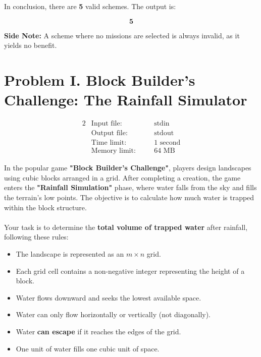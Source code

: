 \documentclass[12pt,a4paper]{article}
\begin{document}
\noindent
In conclusion, there are \textbf{5} valid schemes. The output is:

\[
\mathbf{5}
\]

\noindent
\textbf{Side Note:} A scheme where no missions are selected is always invalid, as it yields no benefit.

\newpage

\section*{\fontsize{18}{12}Problem I. Block Builder's Challenge: The Rainfall Simulator}

\begin{alignat*} {2}
 &   \text{Input file:}   \quad     &&\text{stdin}\\
 &   \text{Output file:}  \quad     &&\text{stdout}\\
 &   \text{Time limit:}   \quad     &&\text{1 second}\\
 &   \text{Memory limit:} \quad     &&\text{64 MB}
\end{alignat*}

\noindent
In the popular game \textbf{"Block Builder's Challenge"}, players design landscapes using cubic blocks arranged in a grid. After completing a creation, the game enters the \textbf{"Rainfall Simulation"} phase, where water falls from the sky and fills the terrain's low points. The objective is to calculate how much water is trapped within the block structure.
\\\\
\noindent
Your task is to determine the \textbf{total volume of trapped water} after rainfall, following these rules:

\begin{itemize}
	\item The landscape is represented as an \( m \times n \) grid.
	\item Each grid cell contains a non-negative integer representing the height of a block.
	\item Water flows downward and seeks the lowest available space.
	\item Water can only flow horizontally or vertically (not diagonally).
	\item Water \textbf{can escape} if it reaches the edges of the grid.
	\item One unit of water fills one cubic unit of space.
\end{itemize}
\end{document}
